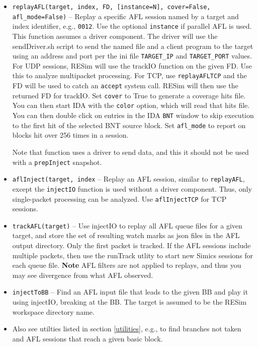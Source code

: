 \documentclass[titlepage]{article}
\begin{document}
\begin{itemize}
\item{\tt replayAFL(target, index, FD, [instance=N], cover=False, afl\_mode=False)} -- Replay a specific AFL session named by a target and index identifier, e.g., {\tt 0012}.  Use the optional {\tt instance} if parallel AFL is used.  This function assumes a driver component. The driver will use the sendDriver.sh script to send the named file and
a client program to the target using an address and port per the ini file {\tt TARGET\_IP} and {\tt TARGET\_PORT} values.  For UDP sessions, RESim will use the trackIO function on the given FD.  Use this to analyze multipacket processing.  For TCP, use {\tt replayAFLTCP} and the FD will be used to catch an {\tt accept} system call.  RESim will then use the returned FD for trackIO.  Set {\tt cover} to True to generate a coverage hits file.  You can then start IDA with the {\tt color} option, which
will read that hits file.   You can then double click on entries in the IDA {\tt BNT} window to skip execution to the first hit of the selected BNT source block.
Set {\tt afl\_mode} to report on blocks hit over 256 times in a session.

Note that function uses a driver to send data, and this it should not be used with a {\tt prepInject} snapshot.

\item{\tt aflInject(target, index} -- Replay an AFL session, similar to {\tt replayAFL}, except the {\tt injectIO} function is used without
a driver component.  Thus, only single-packet processing can be analyzed.  Use {\tt aflInjectTCP} for TCP sessions.

\item{\tt trackAFL(target)} -- Use injectIO to replay all AFL queue files for a given target, and store the set of resulting watch marks as json files
in the AFL output directory.  Only the first packet is tracked.  If the AFL sessions include multiple packets, then use the runTrack utlity to 
start new Simics sessions for each queue file.
\textbf{Note} AFL filters are not applied to replays, and thus you may see divergence from what AFL observed.

\item{\tt injectToBB} -- Find an AFL input file that leads to the given BB and play it using injectIO, breaking at the BB.  The target
is assumed to be the RESim workspace directory name.


\item Also see utilties listed in section \ref{utilities}, e.g., to find branches not taken and AFL sessions that reach a given basic block.

\end{itemize}
\end{document}
